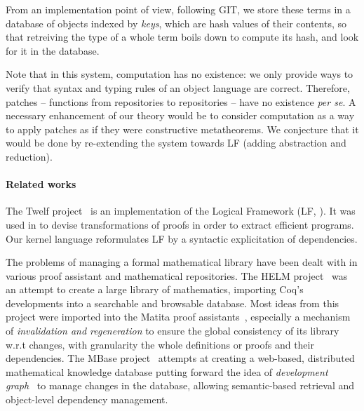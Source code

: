 \documentclass{article}
\begin{document}
From an implementation point of view, following \textsf{GIT}, we store
these terms in a database of objects indexed by \emph{keys}, which are
hash values of their contents, so that retreiving the type of a whole
term boils down to compute its hash, and look for it in the database.

Note that in this system, computation has no existence: we only
provide ways to verify that syntax and typing rules of an object
language are correct. Therefore, patches -- functions from
repositories to repositories -- have no existence \emph{per se}. A
necessary enhancement of our theory would be to consider computation
as a way to apply patches as if they were constructive
metatheorems. We conjecture that it would be done by re-extending the
system towards LF (adding abstraction and reduction).

\paragraph{Related works}
\label{rw}

The \textsf{Twelf} project~\cite{pfenning1999system} is an
implementation of the Logical Framework (LF,
\cite{harper1993framework}). It was used in \cite{anderson1993program}
to devise transformations of proofs in order to extract efficient
programs. Our kernel language reformulates LF by a syntactic
explicitation of dependencies.

The problems of managing a formal mathematical library have been dealt
with in various proof assistant and mathematical repositories. The
HELM project~\cite{asperti2006content} was an attempt to create a
large library of mathematics, importing \textsf{Coq}'s developments
into a searchable and browsable database.  Most ideas from this
project were imported into the \textsf{Matita} proof
assistants~\cite{AspertiCTZ07}, especially a mechanism of
\emph{invalidation and regeneration} to ensure the global consistency
of its library w.r.t changes, with granularity the whole definitions
or proofs and their dependencies. The MBase
project~\cite{kohlhase2001mbase} attempts at creating a web-based,
distributed mathematical knowledge database putting forward the idea
of \emph{development
  graph}~\cite{hutter2000management,autexier2000towards} to manage
changes in the database, allowing semantic-based retrieval and
object-level dependency management. 
\end{document}
